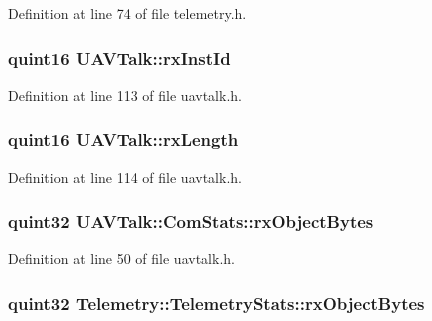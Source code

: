Definition at line 74 of file telemetry.\-h.

\hypertarget{group___u_a_v_talk_plugin_ga72761110b9b683dad5615619c9323674}{
\subsubsection[{rx\-Inst\-Id}]{\setlength{\rightskip}{0pt plus 5cm}quint16 U\-A\-V\-Talk\-::rx\-Inst\-Id\hspace{0.3cm}{\ttfamily [protected]}}}\label{group___u_a_v_talk_plugin_ga72761110b9b683dad5615619c9323674}


Definition at line 113 of file uavtalk.\-h.

\hypertarget{group___u_a_v_talk_plugin_ga52cc4d0f063a520fcf7fc2a10254118b}{
\subsubsection[{rx\-Length}]{\setlength{\rightskip}{0pt plus 5cm}quint16 U\-A\-V\-Talk\-::rx\-Length\hspace{0.3cm}{\ttfamily [protected]}}}\label{group___u_a_v_talk_plugin_ga52cc4d0f063a520fcf7fc2a10254118b}


Definition at line 114 of file uavtalk.\-h.

\hypertarget{group___u_a_v_talk_plugin_ga6a61f515e2c09de8fadddb1d8382a2a1}{
\subsubsection[{rx\-Object\-Bytes}]{\setlength{\rightskip}{0pt plus 5cm}quint32 U\-A\-V\-Talk\-::\-Com\-Stats\-::rx\-Object\-Bytes}}\label{group___u_a_v_talk_plugin_ga6a61f515e2c09de8fadddb1d8382a2a1}


Definition at line 50 of file uavtalk.\-h.

\hypertarget{group___u_a_v_talk_plugin_ga495b5acf35424dbdf221e81f0024ae92}{
\subsubsection[{rx\-Object\-Bytes}]{\setlength{\rightskip}{0pt plus 5cm}quint32 Telemetry\-::\-Telemetry\-Stats\-::rx\-Object\-Bytes}}\label{group___u_a_v_talk_plugin_ga495b5acf35424dbdf221e81f0024ae92}


